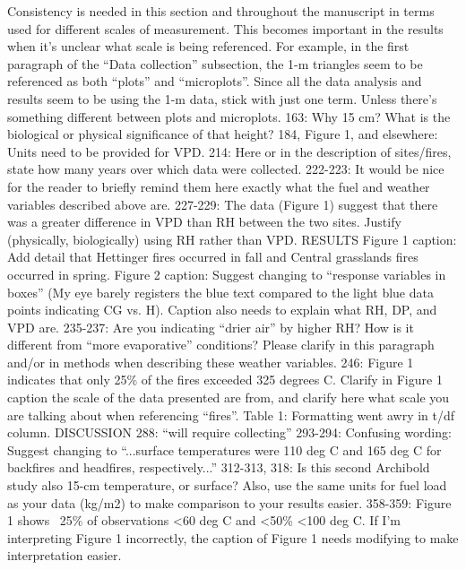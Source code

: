 \documentclass[parskip=half]{scrartcl}
\begin{document}
Consistency is needed in this section and throughout the manuscript in terms used for different scales of measurement. This becomes important in the results when it’s unclear what scale is being referenced. For example, in the first paragraph of the ``Data collection'' subsection, the 1-m triangles seem to be referenced as both ``plots'' and ``microplots''. Since all the data analysis and results seem to be using the 1-m data, stick with just one term. Unless there’s something different between plots and microplots.
163: Why 15 cm? What is the biological or physical significance of that height?
184, Figure 1, and elsewhere: Units need to be provided for VPD. 
214: Here or in the description of sites/fires, state how many years over which data were collected.
222-223: It would be nice for the reader to briefly remind them here exactly what the fuel and weather variables described above are.
227-229: The data (Figure 1) suggest that there was a greater difference in VPD than RH between the two sites. Justify (physically, biologically) using RH rather than VPD. 
RESULTS
Figure 1 caption: Add detail that Hettinger fires occurred in fall and Central grasslands fires occurred in spring.
Figure 2 caption:  Suggest changing to ``response variables in boxes'' (My eye barely registers the blue text compared to the light blue data points indicating CG vs. H). Caption also needs to explain what RH, DP, and VPD are.
235-237: Are you indicating ``drier air'' by higher RH? How is it different from ``more evaporative'' conditions? Please clarify in this paragraph and/or in methods when describing these weather variables.
246: Figure 1 indicates that only 25\% of the fires exceeded 325 degrees C. Clarify in Figure 1 caption the scale of the data presented are from, and clarify here what scale you are talking about when referencing ``fires''.
Table 1: Formatting went awry in t/df column.
DISCUSSION
288: ``will require collecting''
293-294: Confusing wording: Suggest changing to ``...surface temperatures were 110 deg C and 165 deg C for backfires and headfires, respectively...''
312-313, 318: Is this second Archibold study also 15-cm temperature, or surface? Also, use the same units for fuel load as your data (kg/m2) to make comparison to your results easier.
358-359: Figure 1 shows ~25\% of observations <60 deg C and <50\% <100 deg C. If I’m interpreting Figure 1 incorrectly, the caption of Figure 1 needs modifying to make interpretation easier.
\end{document}
